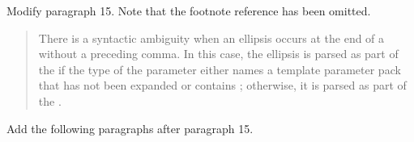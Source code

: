 Modify paragraph 15. Note that the footnote reference has been
omitted.

\begin{quote}
\setcounter{Paras}{14}
\pnum
There is a syntactic ambiguity when an ellipsis occurs at the end of a 
 without a preceding comma. In this 
case, the ellipsis is parsed as part of the  
if the type of the parameter either names a template parameter pack that has 
not been expanded or contains   ; otherwise, it is parsed as part 
of the .
\end{quote}

Add the following paragraphs after paragraph 15.

